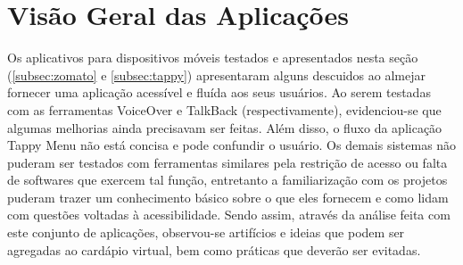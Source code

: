 \section{Visão Geral das Aplicações}

Os aplicativos para dispositivos móveis testados e apresentados nesta seção (\ref{subsec:zomato} e \ref{subsec:tappy}) apresentaram alguns descuidos ao almejar fornecer uma aplicação acessível e fluída aos seus usuários. Ao serem testadas com as ferramentas VoiceOver e TalkBack (respectivamente), evidenciou-se que algumas melhorias ainda precisavam ser feitas. Além disso, o fluxo da aplicação Tappy Menu não está concisa e pode confundir o usuário. Os demais sistemas não puderam ser testados com ferramentas similares pela restrição de acesso ou falta de softwares que exercem tal função, entretanto a familiarização com os projetos puderam trazer um conhecimento básico sobre o que eles fornecem e como lidam com questões voltadas à acessibilidade. Sendo assim, através da análise feita com este conjunto de aplicações, observou-se artifícios e ideias que podem ser agregadas ao cardápio virtual, bem como práticas que deverão ser evitadas.